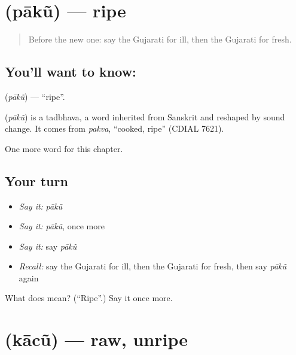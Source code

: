 \section[\texorpdfstring{\gu{પાકું} (pākũ)}{પાકું (pākũ)}]{ (pākũ) — ripe}

\label{lesson:GU-C135-paku}



\begin{quote}
Before the new one: say the Gujarati for ill, then the Gujarati for fresh.
\end{quote}

\subsection*{You'll want to know: }
\textbf{} (\emph{pākũ}) — \textquotedblleft{}ripe\textquotedblright{}.

\begin{cousinweb}
\textbf{} (\emph{pākũ}) is a tadbhava, a word inherited from Sanskrit and reshaped by sound change. It comes from \emph{pakva}, \textquotedblleft{}cooked, ripe\textquotedblright{} (CDIAL 7621).
\end{cousinweb}

\begin{grammarlens}[title={What you've built}]
One more word for this chapter.
\end{grammarlens}

\subsection*{Your turn}
\begin{itemize}
\raggedright
  \item \emph{Say it:} \emph{pākũ}
  \item \emph{Say it:} \emph{pākũ}, once more
  \item \emph{Say it:} say \emph{pākũ}
  \item \emph{Recall:} say the Gujarati for ill, then the Gujarati for fresh, then say \emph{pākũ} again
\end{itemize}

\begin{tcolorbox}[breakable,colback=teal!4,colframe=teal!35!black,title={Before you move on}]
What does  mean? (\textquotedblleft{}Ripe\textquotedblright{}.) Say it once more.
\end{tcolorbox}
\section[\texorpdfstring{\gu{કાચું} (kācũ)}{કાચું (kācũ)}]{ (kācũ) — raw, unripe}

